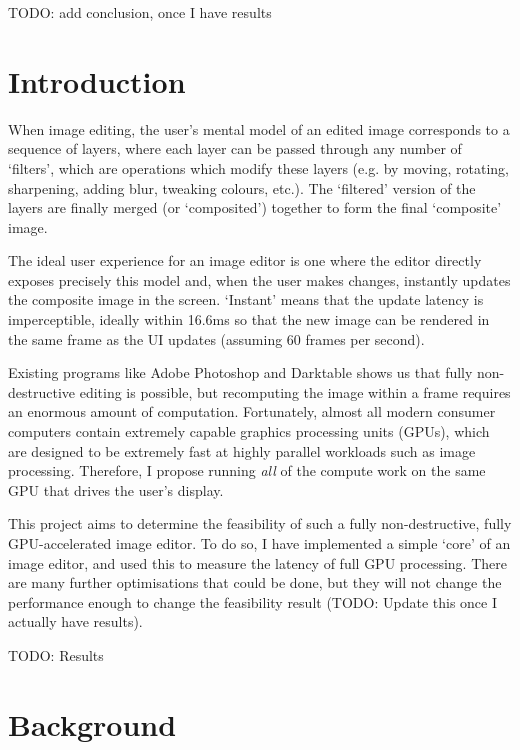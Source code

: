 \documentclass[12pt]{article}
\begin{document}
TODO: add conclusion, once I have results



\pagebreak

\tableofcontents



\pagebreak

\section{Introduction}

When image editing, the user's mental model of an edited image corresponds to a sequence of layers,
where each layer can be passed through any number of `filters', which are operations which modify
these layers (e.g. by moving, rotating, sharpening, adding blur, tweaking colours, etc.).  The
`filtered' version of the layers are finally merged (or `composited') together to form the final
`composite' image.

The ideal user experience for an image editor is one where the editor directly exposes precisely
this model and, when the user makes changes, instantly updates the composite image in the screen.
`Instant' means that the update latency is imperceptible, ideally within 16.6ms so that the new
image can be rendered in the same frame as the UI updates (assuming 60 frames per second).

Existing programs like Adobe Photoshop and Darktable shows us that fully non-destructive editing is
possible, but recomputing the image within a frame requires an enormous amount of computation.
Fortunately, almost all modern consumer computers contain extremely capable graphics processing
units (GPUs), which are designed to be extremely fast at highly parallel workloads such as image
processing.  Therefore, I propose running \emph{all} of the compute work on the same GPU that drives
the user's display.

This project aims to determine the feasibility of such a fully non-destructive, fully
GPU-accelerated image editor.  To do so, I have implemented a simple `core' of an image editor, and
used this to measure the latency of full GPU processing.  There are many further optimisations that
could be done, but they will not change the performance enough to change the feasibility result
(TODO: Update this once I actually have results).

TODO: Results



\pagebreak

\section{Background}
\end{document}
